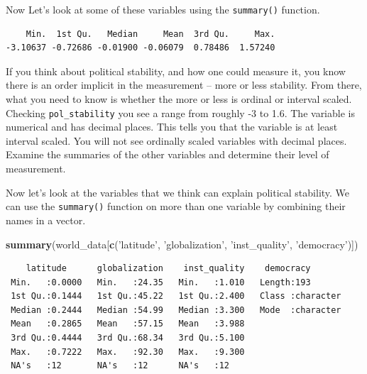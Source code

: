 \documentclass[]{article}
\newenvironment{Shaded}{\begin{snugshade}}{\end{snugshade}}
\newcommand{\KeywordTok}[1]{\textcolor[rgb]{0.13,0.29,0.53}{\textbf{#1}}}
\newcommand{\NormalTok}[1]{#1}
\newcommand{\OperatorTok}[1]{\textcolor[rgb]{0.81,0.36,0.00}{\textbf{#1}}}
\newcommand{\StringTok}[1]{\textcolor[rgb]{0.31,0.60,0.02}{#1}}
\begin{document}
Now Let's look at some of these variables using the \texttt{summary()} function.

\begin{Shaded}
\end{Shaded}

\begin{verbatim}
    Min.  1st Qu.   Median     Mean  3rd Qu.     Max. 
-3.10637 -0.72686 -0.01900 -0.06079  0.78486  1.57240 
\end{verbatim}

If you think about political stability, and how one could measure it, you know there is an order implicit in the measurement -- more or less stability. From there, what you need to know is whether the more or less is ordinal or interval scaled. Checking \texttt{pol\_stability} you see a range from roughly -3 to 1.6. The variable is numerical and has decimal places. This tells you that the variable is at least interval scaled. You will not see ordinally scaled variables with decimal places. Examine the summaries of the other variables and determine their level of measurement.

Now let's look at the variables that we think can explain political stability. We can use the \texttt{summary()} function on more than one variable by combining their names in a vector.

\begin{Shaded}
\begin{Highlighting}[]
\KeywordTok{summary}\NormalTok{(world_data[}\KeywordTok{c}\NormalTok{(}\StringTok{'latitude'}\NormalTok{, }\StringTok{'globalization'}\NormalTok{, }\StringTok{'inst_quality'}\NormalTok{, }\StringTok{'democracy'}\NormalTok{)])}
\end{Highlighting}
\end{Shaded}

\begin{verbatim}
    latitude      globalization    inst_quality    democracy        
 Min.   :0.0000   Min.   :24.35   Min.   :1.010   Length:193        
 1st Qu.:0.1444   1st Qu.:45.22   1st Qu.:2.400   Class :character  
 Median :0.2444   Median :54.99   Median :3.300   Mode  :character  
 Mean   :0.2865   Mean   :57.15   Mean   :3.988                     
 3rd Qu.:0.4444   3rd Qu.:68.34   3rd Qu.:5.100                     
 Max.   :0.7222   Max.   :92.30   Max.   :9.300                     
 NA's   :12       NA's   :12      NA's   :12                        
\end{verbatim}
\end{document}
